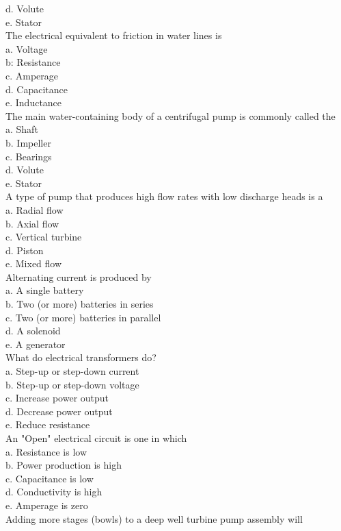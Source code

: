d. Volute\\
e. Stator\\
The electrical equivalent to friction in water lines is\\
a. Voltage\\
b: Resistance\\
c. Amperage\\
d. Capacitance\\
e. Inductance\\
The main water-containing body of a centrifugal pump is commonly called the\\
a. Shaft\\
b. Impeller\\
c. Bearings\\
d. Volute\\
e. Stator\\
A type of pump that produces high flow rates with low discharge heads is a\\
a. Radial flow\\
b. Axial flow\\
c. Vertical turbine\\
d. Piston\\
e. Mixed flow\\
Alternating current is produced by\\
a. A single battery\\
b. Two (or more) batteries in series\\
c. Two (or more) batteries in parallel\\
d. A solenoid\\
e. A generator\\
What do electrical transformers do?\\
a. Step-up or step-down current\\
b. Step-up or step-down voltage\\
c. Increase power output\\
d. Decrease power output\\
e. Reduce resistance\\
An "Open" electrical circuit is one in which\\
a. Resistance is low\\
b. Power production is high\\
c. Capacitance is low\\
d. Conductivity is high\\
e. Amperage is zero\\
Adding more stages (bowls) to a deep well turbine pump assembly will\\
